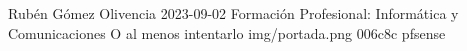 \documentclass{\ClassPath/yukibook}
\begin{document}
    {Rubén Gómez Olivencia}  %
    {2023-09-02}    %
    {Formación Profesional: \linebreak Informática y Comunicaciones} %
    {O al menos intentarlo} %
    {} %
    {img/portada.png} %
    {006c8c}
    {pfsense} %

    \coverpage
    \graphicspath{{../../yukibook.cls/}}
    \licensepage

    \tableofcontents

    \graphicspath{{img/documentacion/}}
    
\end{document}

